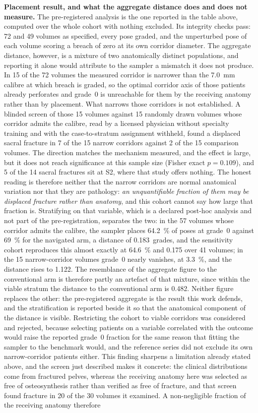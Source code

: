 \documentclass[9pt]{extarticle}
\begin{document}
\textbf{Placement result, and what the aggregate distance does and does not measure.} The pre-registered analysis is the one reported in the table above, computed over the whole cohort with nothing excluded. Its integrity checks pass: 72 and 49 volumes as specified, every pose graded, and the unperturbed pose of each volume scoring a breach of zero at its own corridor diameter. The aggregate distance, however, is a mixture of two anatomically distinct populations, and reporting it alone would attribute to the sampler a mismatch it does not produce. In 15 of the 72 volumes the measured corridor is narrower than the 7.0~mm calibre at which breach is graded, so the optimal corridor axis of those patients already perforates and grade~0 is unreachable for them by the receiving anatomy rather than by placement. What narrows those corridors is not established. A blinded screen of those 15 volumes against 15 randomly drawn volumes whose corridor admits the calibre, read by a licensed physician without specialty training and with the case-to-stratum assignment withheld, found a displaced sacral fracture in 7 of the 15 narrow corridors against 2 of the 15 comparison volumes. The direction matches the mechanism \citet{reilly2003effect} measured, and the effect is large, but it does not reach significance at this sample size (Fisher exact $p=0.109$), and 5 of the 14 sacral fractures sit at S2, where that study offers nothing. The honest reading is therefore neither that the narrow corridors are normal anatomical variation nor that they are pathology: \emph{an unquantifiable fraction of them may be displaced fracture rather than anatomy}, and this cohort cannot say how large that fraction is. Stratifying on that variable, which is a declared post-hoc analysis and not part of the pre-registration, separates the two: in the 57 volumes whose corridor admits the calibre, the sampler places 64.2~\% of poses at grade~0 against 69~\% for the navigated arm, a distance of 0.183~grades, and the sensitivity cohort reproduces this almost exactly at 64.6~\% and 0.175 over 41 volumes; in the 15 narrow-corridor volumes grade~0 nearly vanishes, at 3.3~\%, and the distance rises to 1.122. The resemblance of the aggregate figure to the conventional arm is therefore partly an artefact of that mixture, since within the viable stratum the distance to the conventional arm is 0.482. Neither figure replaces the other: the pre-registered aggregate is the result this work defends, and the stratification is reported beside it so that the anatomical component of the distance is visible. Restricting the cohort to viable corridors was considered and rejected, because selecting patients on a variable correlated with the outcome would raise the reported grade~0 fraction for the same reason that fitting the sampler to the benchmark would, and the reference series did not exclude its own narrow-corridor patients either. This finding sharpens a limitation already stated above, and the screen just described makes it concrete: the clinical distributions come from fractured pelves, whereas the receiving anatomy here was selected as free of osteosynthesis rather than verified as free of fracture, and that screen found fracture in 20 of the 30 volumes it examined. A non-negligible fraction of the receiving anatomy therefore 
\end{document}
